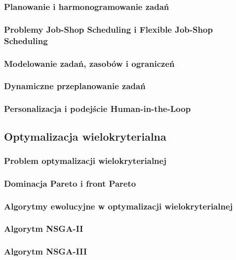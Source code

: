     \subsubsection{Planowanie i harmonogramowanie zadań}

    \subsubsection{Problemy Job-Shop Scheduling i Flexible Job-Shop Scheduling}

    \subsubsection{Modelowanie zadań, zasobów i ograniczeń}

    \subsubsection{Dynamiczne przeplanowanie zadań}

    \subsubsection{Personalizacja i podejście Human-in-the-Loop}


\subsection{Optymalizacja wielokryterialna}

    \subsubsection{Problem optymalizacji wielokryterialnej}

    \subsubsection{Dominacja Pareto i front Pareto}

    \subsubsection{Algorytmy ewolucyjne w optymalizacji wielokryterialnej}

    \subsubsection{Algorytm NSGA-II}

    \subsubsection{Algorytm NSGA-III}


